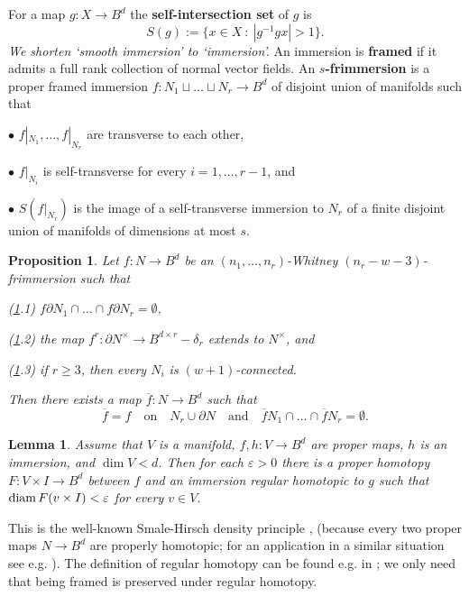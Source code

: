 \documentclass[12pt]{article}
\def\diag{\delta}
\def\diam{\mathop{\fam0 diam}}
\theoremstyle{plain}
\newtheorem{Lemma}[Theorem]{Lemma}
\newtheorem{Proposition}[Theorem]{Proposition}
\theoremstyle{definition}
\begin{document}
For a map $g:X\to B^d$ the {\bf self-intersection set} of $g$ is
$$S(g):=\{x\in X\ :\ |g^{-1}gx|>1\}.$$
{\it We shorten `smooth immersion' to `immersion'.}
An immersion is {\bf framed} if it admits a full rank collection of normal vector fields.
An {\bf $s$-frimmersion} is a proper framed immersion $f:N_1\sqcup\ldots\sqcup N_r\to B^d$ of disjoint union of   manifolds such that


$\bullet$ $f|_{N_1},\ldots,f|_{N_r}$ are transverse to each other,

$\bullet$ $f|_{N_i}$ is self-transverse for every $i=1,\ldots,r-1$, and

$\bullet$ $S(f|_{N_r})$ is the image of a self-transverse immersion to $N_r$ of a finite disjoint union of manifolds of dimensions at most $s$.

\begin{Proposition}\label{l:ldmin}
Let $f:N\to B^d$ be an $(n_1,\ldots,n_r)$-Whitney
$(n_r-w-3)$-frimmersion
such that

(\ref{l:ldmin}.1) $f\partial N_1\cap\ldots\cap f\partial N_r=\emptyset$,

(\ref{l:ldmin}.2) the map $f^r:\partial N^\times\to B^{d\times r}-\diag_r$ extends to $N^\times$, and

(\ref{l:ldmin}.3) if $r\ge3$, then every $N_i$ is $(w+1)$-connected.

Then there exists a map
$\overline f:N\to B^d$ such that
$$\overline f=f \quad\text{on}\quad N_r\cup\partial N \quad\text{and}\quad
\overline fN_1\cap\ldots\cap \overline fN_r=\emptyset.$$
\end{Proposition}

\begin{Lemma}\label{l:hprin}
Assume that $V$ is a manifold, $f,h:V\to B^d$ are proper maps,
$h$ is an immersion, and $\dim V<d$.
Then for each $\varepsilon>0$ there is a proper homotopy $F:V\times I\to B^d$
between $f$ and an immersion regular homotopic to $g$ such that
$\diam F(v\times I)<\varepsilon$ for every $v\in V$.
\end{Lemma}

This is the well-known Smale-Hirsch density principle \cite[Theorems 5.7 and 5.10]{Hi59}, \cite[\S1.2.2.A]{Gr86}
(because every two proper maps $N\to B^d$ are properly homotopic;
for an application in a similar situation see e.g. \cite[the paragraph before (4.1)]{Ko88}).
The definition of regular homotopy can be found e.g. in \cite[Definition 2.7]{Ko13}; we only need that being framed is preserved under regular homotopy.
\end{document}

